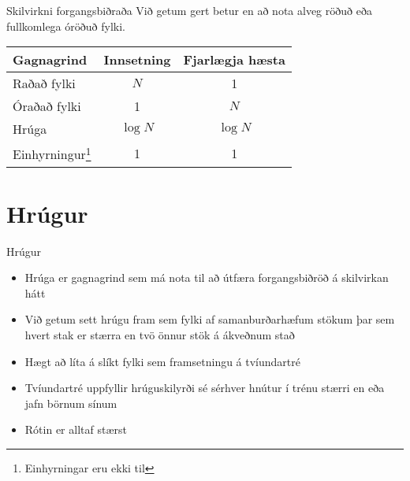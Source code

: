 \documentclass{beamer}
\begin{document}
\begin{frame}{Skilvirkni forgangsbiðraða}
	Við getum gert betur en að nota alveg röðuð eða fullkomlega óröðuð fylki.
	\begin{center}
		\begin{tabular}{lcc}
			\toprule
			Gagnagrind                                       & Innsetning & Fjarlægja hæsta \\
			\midrule
			Raðað fylki                                      & $N$        & 1               \\
			Óraðað fylki                                     & 1          & $N$             \\
			Hrúga                                            & $\log N$   & $\log N$        \\
			Einhyrningur\footnote{Einhyrningar eru ekki til} & 1          & 1               \\
			\bottomrule
		\end{tabular}
	\end{center}
\end{frame}

\section{Hrúgur}

\begin{frame}{Hrúgur}
	\begin{itemize}
		\item Hrúga er gagnagrind sem má nota til að útfæra forgangsbiðröð á skilvirkan hátt
		\item Við getum sett hrúgu fram sem fylki af samanburðarhæfum stökum þar sem hvert stak er stærra en tvö önnur stök á ákveðnum stað
		\item Hægt að líta á slíkt fylki sem framsetningu á tvíundartré 
		\item Tvíundartré uppfyllir hrúguskilyrði  sé sérhver hnútur í trénu stærri en eða jafn börnum sínum
		\item Rótin er alltaf stærst
	\end{itemize}
\end{frame}

\end{document}
